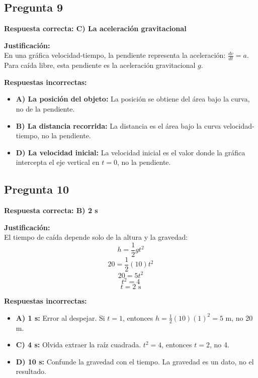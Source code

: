 \begin{respuestabox}
\subsection{Pregunta 9}
\textcolor{verdecorrecto}{\textbf{Respuesta correcta: C) La aceleración gravitacional}}

\textbf{Justificación:}\\
En una gráfica velocidad-tiempo, la pendiente representa la aceleración: $\frac{dv}{dt} = a$. Para caída libre, esta pendiente es la aceleración gravitacional $g$.

\textbf{Respuestas incorrectas:}
\begin{itemize}
    \item \textbf{A) La posición del objeto:} La posición se obtiene del área bajo la curva, no de la pendiente.
    \item \textbf{B) La distancia recorrida:} La distancia es el área bajo la curva velocidad-tiempo, no la pendiente.
    \item \textbf{D) La velocidad inicial:} La velocidad inicial es el valor donde la gráfica intercepta el eje vertical en $t=0$, no la pendiente.
\end{itemize}
\end{respuestabox}

\newpage

\begin{respuestabox}
\subsection{Pregunta 10}
\textcolor{verdecorrecto}{\textbf{Respuesta correcta: B) 2 s}}

\textbf{Justificación:}\\
El tiempo de caída depende solo de la altura y la gravedad:
$$h = \frac{1}{2}gt^2$$
$$20 = \frac{1}{2}(10)t^2$$
$$20 = 5t^2$$
$$t^2 = 4$$
$$t = 2 \text{ s}$$

\textbf{Respuestas incorrectas:}
\begin{itemize}
    \item \textbf{A) 1 s:} Error al despejar. Si $t = 1$, entonces $h = \frac{1}{2}(10)(1)^2 = 5$ m, no 20 m.
    \item \textbf{C) 4 s:} Olvida extraer la raíz cuadrada. $t^2 = 4$, entonces $t = 2$, no 4.
    \item \textbf{D) 10 s:} Confunde la gravedad con el tiempo. La gravedad es un dato, no el resultado.
\end{itemize}
\end{respuestabox}

